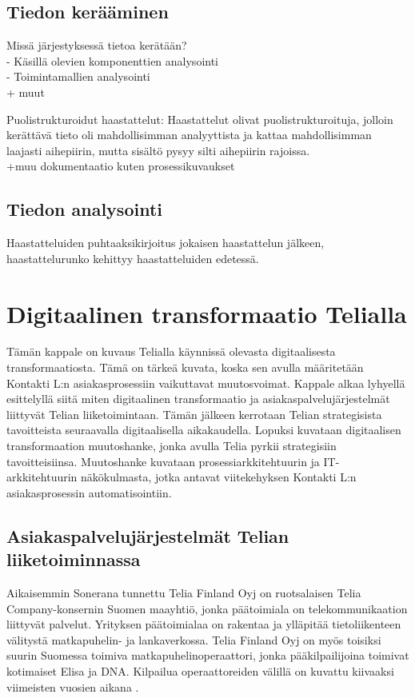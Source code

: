 \documentclass[finnish,12pt,a4paper,pdftex]{article}
\begin{document}
\subsection{Tiedon kerääminen}

Missä järjestyksessä tietoa kerätään? \\
- Käsillä olevien komponenttien analysointi\\
- Toimintamallien analysointi\\
+ muut

Puolistrukturoidut haastattelut:  Haastattelut olivat
puolistrukturoituja, jolloin kerättävä tieto oli mahdollisimman analyyttista ja
kattaa mahdollisimman laajasti aihepiirin, mutta sisältö pysyy silti aihepiirin
rajoissa.\\
+muu dokumentaatio kuten prosessikuvaukset


\subsection{Tiedon analysointi}
Haastatteluiden puhtaaksikirjoitus jokaisen haastattelun jälkeen, haastattelurunko kehittyy haastatteluiden edetessä. 

\section{Digitaalinen transformaatio Telialla}


Tämän kappale on kuvaus Telialla käynnissä olevasta digitaalisesta transformaatiosta. Tämä on tärkeä kuvata, koska sen avulla määritetään Kontakti L:n asiakasprosessiin vaikuttavat muutosvoimat. Kappale alkaa lyhyellä esittelyllä siitä miten digitaalinen transformaatio ja asiakaspalvelujärjestelmät liittyvät Telian liiketoimintaan. Tämän jälkeen kerrotaan Telian strategisista tavoitteista seuraavalla digitaalisella aikakaudella. Lopuksi kuvataan digitaalisen transformaation muutoshanke, jonka avulla Telia pyrkii strategisiin tavoitteisiinsa. Muutoshanke kuvataan prosessiarkkitehtuurin ja IT-arkkitehtuurin näkökulmasta, jotka antavat viitekehyksen Kontakti L:n asiakasprosessin automatisointiin.

\subsection{Asiakaspalvelujärjestelmät Telian liiketoiminnassa}

Aikaisemmin Sonerana tunnettu Telia Finland Oyj on ruotsalaisen Telia Company-konsernin Suomen maayhtiö, jonka päätoimiala on telekommunikaation liittyvät palvelut. Yrityksen päätoimialaa on rakentaa ja ylläpitää tietoliikenteen välitystä matkapuhelin- ja lankaverkossa. Telia Finland Oyj on myös toisiksi suurin Suomessa toimiva matkapuhelinoperaattori, jonka pääkilpailijoina toimivat kotimaiset Elisa ja DNA. Kilpailua operaattoreiden välillä on kuvattu kiivaaksi viimeisten vuosien aikana \citep{hesari}. \\
\end{document}
